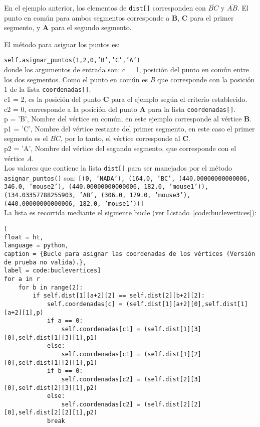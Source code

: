 En el ejemplo anterior, los elementos de \texttt{dist[]} corresponden con $\overline{BC}$ y $\overline{AB}$. El punto en común para ambos segmentos corresponde a \textbf{B}, \textbf{C} para el primer segmento, y \textbf{A} para el segundo segmento.

El método para asignar los puntos es:

\texttt{self.asignar\_puntos(1,2,0,'B','C','A')}\\
donde los argumentos de entrada son:
c = 1, posición del punto en común entre los dos segmentos. Como el punto en común es \textit{B} que corresponde con la posición 1 de la lista \texttt{coordenadas[]}.\\
c1 = 2, es la posición del punto \textbf{C} para el ejemplo según el criterio establecido.\\
c2 = 0, corresponde a la posición del punto \textbf{A} para la lista \texttt{coordenadas[]}.\\
p = 'B', Nombre del vértice en común, en este ejemplo corresponde al vértice \textbf{B}.\\
p1 = 'C', Nombre del vértice restante del primer segmento, en este caso el primer segmento es el $\overline{BC}$, por lo tanto, el vértice corresponde al \textbf{C}.\\
p2 = 'A', Nombre del vértice del segundo segmento, que corresponde con el vértice \textit{A}.\\

Los valores que contiene la lista \texttt{dist[]} para ser manejados por el método \texttt{asignar\_puntos()} son:
\texttt{[(0, 'NADA'), (164.0, 'BC', (440.00000000000006, 346.0, 'mouse2'), (440.00000000000006, 182.0, 'mouse1')), (134.03357788255903, 'AB', (306.0, 179.0, 'mouse3'), (440.00000000000006, 182.0, 'mouse1'))]}\\

La lista es recorrida mediante el siguiente bucle (ver Listado~\ref{code:buclevertices}):
\begin{lstlisting}[
float = ht, 
language = python,
caption = {Bucle para asignar las coordenadas de los vértices (Versión de prueba no valida).},
label = code:buclevertices]
for a in r
	for b in range(2):
		if self.dist[1][a+2][2] == self.dist[2][b+2][2]:
			self.coordenadas[c] = (self.dist[1][a+2][0],self.dist[1][a+2][1],p)
			if a == 0:
				self.coordenadas[c1] = (self.dist[1][3][0],self.dist[1][3][1],p1)
			else:
				self.coordenadas[c1] = (self.dist[1][2][0],self.dist[1][2][1],p1)
			if b == 0:
				self.coordenadas[c2] = (self.dist[2][3][0],self.dist[2][3][1],p2)
			else:
				self.coordenadas[c2] = (self.dist[2][2][0],self.dist[2][2][1],p2)
			break
\end{lstlisting}

